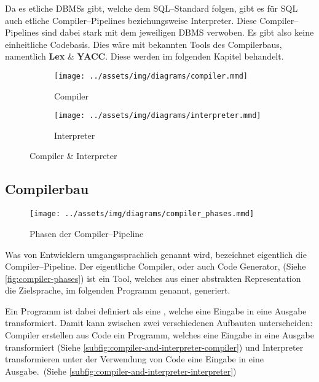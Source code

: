 Da es etliche \acp{DBMS} gibt, welche dem \ac{SQL}--Standard folgen, gibt es für \ac{SQL} auch etliche Compiler--Pipelines beziehungsweise Interpreter.
Diese Compiler--Pipelines sind dabei stark mit dem jeweiligen \ac{DBMS} verwoben.
Es gibt also keine einheitliche Codebasis.
Dies wäre mit bekannten Tools des Compilerbaus, namentlich \textbf{Lex} \& \textbf{YACC}.
Diese werden im folgenden Kapitel behandelt.

\begin{figure}[ht]
    \begin{subfigure}[c]{0.5\textwidth}
        \begin{center}
            \texttt{[image: ../assets/img/diagrams/compiler.mmd]}
        \end{center}
        \caption{Compiler}
        \label{subfig:compiler-and-interpreter-compiler}
    \end{subfigure}
    \begin{subfigure}[c]{0.5\textwidth}
        \begin{center}
            \texttt{[image: ../assets/img/diagrams/interpreter.mmd]}
        \end{center}
        \caption{Interpreter}
        \label{subfig:compiler-and-interpreter-interpreter}
    \end{subfigure}
    \caption{Compiler \& Interpreter~\autocite{aho-2006}}
    \label{fig:compiler-and-interpreter}
\end{figure}
\newpage

\subsection{Compilerbau}\label{subsec:compilerbau}
\begin{wrapfigure}{rH}{0.47\textwidth}
    \begin{center}
        \texttt{[image: ../assets/img/diagrams/compiler\_phases.mmd]}
    \end{center}
    \caption{Phasen der Compiler--Pipeline~\autocite{aho-2006}}
    \label{fig:compiler-phases}
\end{wrapfigure}
Was von Entwicklern umgangssprachlich  genannt wird, bezeichnet eigentlich die Compiler--Pipeline.
Der eigentliche Compiler, oder auch Code Generator, (Siehe \autoref{fig:compiler-phases}) ist ein Tool, welches aus einer abstrakten Representation die Zielsprache, im folgenden Programm genannt, generiert.

Ein Programm ist dabei definiert als eine , welche eine Eingabe in eine Ausgabe transformiert.
Damit kann zwischen zwei verschiedenen Aufbauten unterscheiden: Compiler erstellen aus Code ein Programm, welches eine Eingabe in eine Ausgabe transformiert (Siehe \autoref{subfig:compiler-and-interpreter-compiler}) und Interpreter transformieren unter der Verwendung von Code eine Eingabe in eine Ausgabe.~(Siehe \autoref{subfig:compiler-and-interpreter-interpreter})

